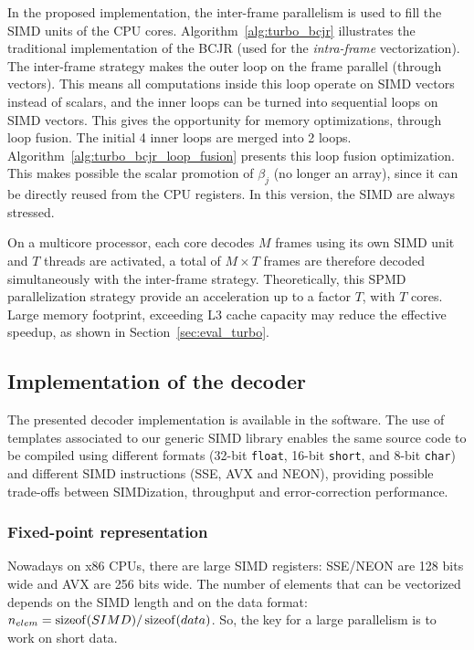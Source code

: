 In the proposed implementation, the inter-frame parallelism is used to fill the
SIMD units of the CPU cores. Algorithm~\ref{alg:turbo_bcjr} illustrates the
traditional implementation of the BCJR (used for the \emph{intra-frame}
vectorization). The inter-frame strategy makes the outer loop on the frame
parallel (through vectors). This means all computations inside this loop operate
on SIMD vectors instead of scalars, and the inner loops can be turned into
sequential loops on SIMD vectors. This gives the opportunity for memory
optimizations, through loop fusion. The initial 4 inner loops are merged into 2
loops. Algorithm~\ref{alg:turbo_bcjr_loop_fusion} presents this loop fusion
optimization. This makes possible the scalar promotion of $\beta_j$ (no longer
an array), since it can be directly reused from the CPU registers. In this
version, the SIMD are always stressed.

On a multicore processor, each core decodes $M$ frames using its own SIMD unit
and $T$ threads are activated, a total of $M\times T$ frames are therefore
decoded simultaneously with the inter-frame strategy. Theoretically, this SPMD
parallelization strategy provide an acceleration up to a factor $T$, with $T$
cores. Large memory footprint, exceeding L3 cache capacity may reduce the
effective speedup, as shown in Section~\ref{sec:eval_turbo}.

\subsection{Implementation of the decoder}
\label{sec:turbo_implem}

The presented decoder implementation is available in the \AFFECT software. The
use of \Cxx templates associated to our generic SIMD library enables the
same source code to be compiled using different formats (32-bit \verb|float|,
16-bit \verb|short|, and 8-bit \verb|char|) and different SIMD instructions
(SSE, AVX and NEON), providing possible trade-offs between SIMDization,
throughput and error-correction performance.

\subsubsection{Fixed-point representation}

Nowadays on x86 CPUs, there are large SIMD registers: SSE/NEON are 128 bits
wide and AVX are 256 bits wide. The number of elements that can be vectorized
depends on the SIMD length and on the data format:
$n_{elem} = \operatorname*{sizeof}(SIMD) / \operatorname*{sizeof}(data)$. So, the key for a large parallelism
is to work on short data.

